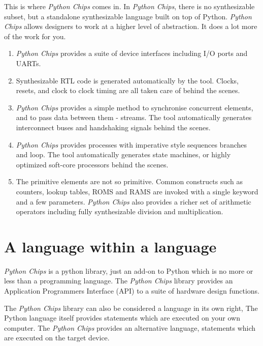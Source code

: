 \documentclass[letterpaper,10pt,english]{manual}
\begin{document}
This is where \emph{Python Chips} comes in. In \emph{Python Chips}, there is no
synthesizable subset, but a standalone synthesizable language built on top
of Python. \emph{Python Chips} allows designers to work at a higher level of
abstraction. It does a lot more of the work for you.
\begin{enumerate}
\item {} 
\emph{Python Chips} provides a suite of device interfaces including
I/O ports and UARTs.

\item {} 
Synthesizable RTL code is generated automatically by the tool.
Clocks, resets, and clock to clock timing are all taken care of
behind the scenes.

\item {} 
\emph{Python Chips} provides a simple method to synchronise concurrent
elements, and to pass data between them - streams. The tool
automatically generates interconnect buses and handshaking
signals behind the scenes.

\item {} 
\emph{Python Chips} provides processes with imperative style
sequences branches and loop. The tool automatically generates
state machines, or highly optimized soft-core processors behind
the scenes.

\item {} 
The primitive elements are not so primitive. Common constructs
such as counters, lookup tables, ROMS and RAMS are invoked with a
single keyword and a few parameters. \emph{Python Chips} also provides
a richer set of arithmetic operators including fully
synthesizable division and multiplication.

\end{enumerate}


\section{A language within a language}

\emph{Python Chips} is a python library, just an add-on to Python which is no
more or less than a programming language. The \emph{Python Chips} library
provides an Application Programmers Interface (API) to a suite of hardware
design functions.

The \emph{Python Chips} library can also be considered a language in its own
right, The Python language itself provides statements which are executed on
your own computer. The \emph{Python Chips} provides an alternative language,
statements which are executed on the target device.
\end{document}
